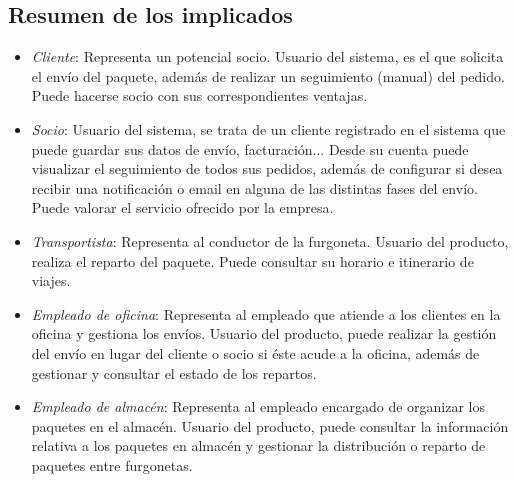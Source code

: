 	\subsection{Resumen de los implicados}
	\begin{itemize}
		\item \textit{Cliente}: Representa un potencial socio. Usuario del sistema, es el que solicita el envío del paquete, además de realizar un seguimiento (manual) del pedido. Puede hacerse socio con sus correspondientes ventajas.
		\item \textit{Socio}: Usuario del sistema, se trata de un cliente registrado en el sistema que puede guardar sus datos de envío, facturación... Desde su cuenta puede visualizar el seguimiento de todos sus pedidos, además de configurar si desea recibir una notificación o email en alguna de las distintas fases del envío. Puede valorar el servicio ofrecido por la empresa.
		\item \textit{Transportista}: Representa al conductor de la furgoneta. Usuario del producto, realiza el reparto del paquete. Puede consultar su horario e itinerario de viajes.
		\item \textit{Empleado de oficina}: Representa al empleado que atiende a los clientes en la oficina y gestiona los envíos. Usuario del producto, puede realizar la gestión del envío en lugar del cliente o socio si éste acude a la oficina, además de gestionar y consultar el estado de los repartos.
		\item \textit{Empleado de almacén}: Representa al empleado encargado de organizar los paquetes en el almacén. Usuario del producto, puede consultar la información relativa a los paquetes en almacén y gestionar la distribución o reparto de paquetes entre furgonetas. \\ \\
	\end{itemize}
	
